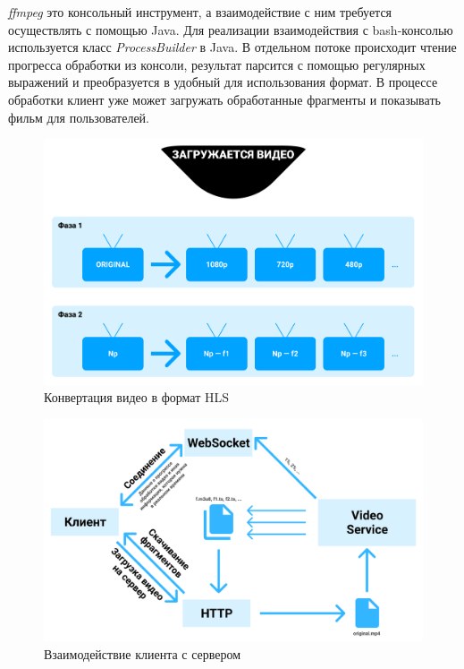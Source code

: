\documentclass{../includes/TechDoc}
\begin{document}
    \emph{ffmpeg} это консольный инструмент, а взаимодействие с ним требуется осуществлять с помощью Java.
    Для реализации взаимодействия с bash-консолью используется класс \emph{ProcessBuilder} в Java.
    В отдельном потоке происходит чтение прогресса обработки из консоли, результат парсится с помощью регулярных выражений и преобразуется в удобный для использования формат.
    В процессе обработки клиент уже может загружать обработанные фрагменты и показывать фильм для пользователей.

    \begin{figure}[h]
        \centering
        \includegraphics[width=1\linewidth]{images/server_converting.png}
        \caption{Конвертация видео в формат HLS}
        \label{fig:server_converting}
    \end{figure}

    \begin{figure}[h]
        \centering
        \includegraphics[width=1\linewidth]{images/video_upload.png}
        \caption{Взаимодействие клиента с сервером}
        \label{fig:video_upload}
    \end{figure}
\end{document}
